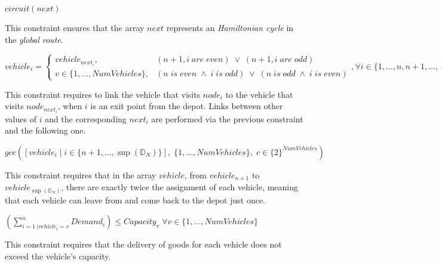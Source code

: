 \documentclass[../main.tex]{subfiles}
\begin{document}
\begin{center} %
    \begin{math}
        circuit(next)
    \end{math}
\end{center}
This constraint ensures that the array $next$ represents an \textit{Hamiltonian cycle} in the \textit{global route}.

\begin{center} %
    \begin{math}
        vehicle_i =
        \begin{cases}
            vehicle_{next_i}, & (\text{$n+1, i$} \; are \; even) \; \vee \; (\text{$n+1, i$} \; are \; odd)\\
            \text{$v \in \{1,\dots,NumVehicles\}$}, & (\text{$n$} \; is \; even \; \wedge \; \text{$i$} \; is \; odd ) \; \vee \; (\text{$n$} \; is \; odd \; \wedge \; \text{$i$} \; is \; even )
        \end{cases},
        \forall i \in \{1,\dots,n,n+1,\dots,\sup{}(\mathbb{D}_N) - 1\}
    \end{math}
\end{center}
This constraint requires to link the vehicle that visits $node_i$ to the vehicle that visits $node_{next_i}$, when $i$ is an exit point from the depot.
Links between other values of $i$ and the corresponding $next_i$ are performed via the previous constraint and the following one.

\begin{center} %
    \begin{math}
        gcc([vehicle_i \; | \; i \in \{n+1,\dots,\sup{}(\mathbb{D}_N)\}], \; \{1,\dots,NumVehicles\}, \; c \in \{2\}^{NumVehicles})
    \end{math}
\end{center}
This constraint requires that in the array $vehicle$, from $vehicle_{n+1}$ to $vehicle_{\sup{}(\mathbb{D}_N)}$, there are exactly twice the assignment of each vehicle, meaning that each vehicle can leave from and come back to the depot just once.

\begin{center} %
    \begin{math}
        (\sum_{i = 1 \; | vehicle_i = v}^n{Demand_i}) \leq Capacity_v \; \forall v \in \{1,\dots,NumVehicles\}
    \end{math}
\end{center}
This constraint requires that the delivery of goods for each vehicle does not exceed the vehicle's capacity.
\end{document}
